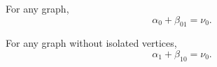 For any graph,
$$\alpha_0 + \beta_{01} = \nu_0.$$

For any graph without isolated vertices,
$$\alpha_1 + \beta_{10} = \nu_0.$$
